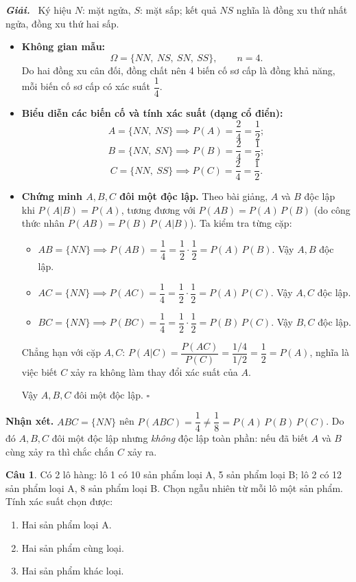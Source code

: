 \documentclass[12pt,a4paper]{article}
\theoremstyle{definition}
\newtheorem{cau}{Câu}
\newcommand{\giai}{\noindent\textbf{\textit{Giải.}}\ }
\begin{document}
\giai
Ký hiệu $N$: mặt ngửa, $S$: mặt sấp; kết quả $NS$ nghĩa là đồng xu thứ nhất ngửa, đồng xu thứ hai sấp.
\begin{itemize}
    \item \textbf{Không gian mẫu:}
    \[
    \Omega = \{NN,\ NS,\ SN,\ SS\}, \qquad n = 4.
    \]
    Do hai đồng xu cân đối, đồng chất nên 4 biến cố sơ cấp là đồng khả năng, mỗi biến cố sơ cấp có xác suất $\dfrac{1}{4}$.
    \item \textbf{Biểu diễn các biến cố và tính xác suất (dạng cổ điển):}
    \[
    A = \{NN,\ NS\} \implies P(A) = \frac{2}{4} = \frac{1}{2};
    \]
    \[
    B = \{NN,\ SN\} \implies P(B) = \frac{2}{4} = \frac{1}{2};
    \]
    \[
    C = \{NN,\ SS\} \implies P(C) = \frac{2}{4} = \frac{1}{2}.
    \]
    \item \textbf{Chứng minh $A, B, C$ đôi một độc lập.} Theo bài giảng, $A$ và $B$ độc lập khi $P(A|B) = P(A)$, tương đương với $P(AB) = P(A)\,P(B)$ (do công thức nhân $P(AB) = P(B)\,P(A|B)$). Ta kiểm tra từng cặp:
    \begin{itemize}
        \item $AB = \{NN\} \implies P(AB) = \dfrac{1}{4} = \dfrac{1}{2} \cdot \dfrac{1}{2} = P(A)\,P(B)$. Vậy $A, B$ độc lập.
        \item $AC = \{NN\} \implies P(AC) = \dfrac{1}{4} = \dfrac{1}{2} \cdot \dfrac{1}{2} = P(A)\,P(C)$. Vậy $A, C$ độc lập.
        \item $BC = \{NN\} \implies P(BC) = \dfrac{1}{4} = \dfrac{1}{2} \cdot \dfrac{1}{2} = P(B)\,P(C)$. Vậy $B, C$ độc lập.
    \end{itemize}
    Chẳng hạn với cặp $A, C$: $P(A|C) = \dfrac{P(AC)}{P(C)} = \dfrac{1/4}{1/2} = \dfrac{1}{2} = P(A)$, nghĩa là việc biết $C$ xảy ra không làm thay đổi xác suất của $A$.

    Vậy $A, B, C$ đôi một độc lập. \hfill $\square$
\end{itemize}
\noindent\textbf{Nhận xét.} $ABC = \{NN\}$ nên $P(ABC) = \dfrac{1}{4} \ne \dfrac{1}{8} = P(A)\,P(B)\,P(C)$. Do đó $A, B, C$ đôi một độc lập nhưng \textit{không} độc lập toàn phần: nếu đã biết $A$ và $B$ cùng xảy ra thì chắc chắn $C$ xảy ra.

\vspace{1em}
\begin{cau}
Có 2 lô hàng: lô 1 có 10 sản phẩm loại A, 5 sản phẩm loại B; lô 2 có 12 sản phẩm loại A, 8 sản phẩm loại B. Chọn ngẫu nhiên từ mỗi lô một sản phẩm. Tính xác suất chọn được:
\begin{enumerate}[label=\arabic*.]
    \item Hai sản phẩm loại A.
    \item Hai sản phẩm cùng loại.
    \item Hai sản phẩm khác loại.
\end{enumerate}
\end{cau}
\end{document}
